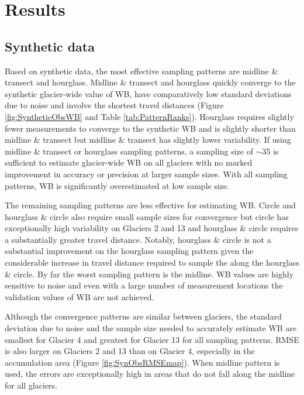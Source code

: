 \documentclass[twocolumn,letterpaper]{igs}
\begin{document}
\section{Results }

\subsection{Synthetic data}

Based on synthetic data, the most effective sampling patterns are midline \& transect and hourglass. Midline \& transect and hourglass quickly converge to the synthetic glacier-wide value of WB, have comparatively low standard deviations due to noise and involve the shortest travel distances (Figure \ref{fig:SyntheticObsWB} and Table \ref{tab:PatternRanks}). Hourglass requires slightly fewer measurements to converge to the synthetic WB and is slightly shorter than midline \& transect but midline \& transect has slightly lower variability. If using midline \& transect or hourglass sampling patterns, a sampling size of $\sim$35 is sufficient to estimate glacier-wide WB on all glaciers with no marked improvement in accuracy or precision at larger sample sizes. With all sampling patterns, WB is significantly overestimated at low sample size.

The remaining sampling patterns are less effective for estimating WB. Circle and hourglass \& circle also require small sample sizes for convergence but circle has exceptionally high variability on Glaciers 2 and 13 and hourglass \& circle requires a substantially greater travel distance. Notably, hourglass \& circle is not a substantial improvement on the hourglass sampling pattern given the considerable increase in travel distance required to sample the along the hourglass \& circle. By far the worst sampling pattern is the midline. WB values are highly sensitive to noise and even with a large number of measurement locations the validation values of WB are not achieved.

Although the convergence patterns are similar between glaciers, the standard deviation due to noise and the sample size needed to accurately estimate WB are smallest for Glacier 4 and greatest for Glacier 13 for all sampling patterns. RMSE is also larger on Glaciers 2 and 13 than on Glacier 4, especially in the accumulation area (Figure \ref{fig:SynObsRMSEmap}). When midline pattern is used, the errors are exceptionally high in areas that do not fall along the midline for all glaciers.
\end{document}
